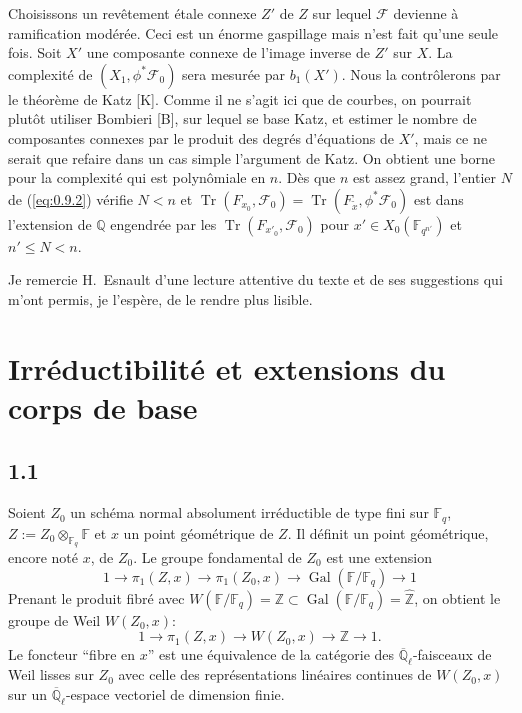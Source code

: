 \documentclass[10pt,a4paper]{article}
\theoremstyle{plain}
\theoremstyle{definition}
\DeclareMathOperator{\Gal}{Gal}
\DeclareMathOperator{\tr}{Tr}
\begin{document}
Choisissons un rev\^etement \'etale connexe $Z'$ de $Z$ sur lequel $\mathcal{F}$ devienne \`a ramification mod\'er\'ee. Ceci est un \'enorme gaspillage mais n'est fait qu'une seule fois. Soit $X'$ une composante connexe de l'image inverse de $Z'$ sur $X$. La complexit\'e de $(X_1, \phi^* \mathcal{F}_0)$ sera mesur\'ee par $b_1(X')$. Nous la contr\^olerons par le th\'eor\`eme de Katz [K]. Comme il ne s'agit ici que de courbes, on pourrait plut\^ot utiliser Bombieri [B], sur lequel se base Katz, et estimer le nombre de composantes connexes par le produit des degr\'es d'\'equations de $X'$, mais ce ne serait que refaire dans un cas simple l'argument de Katz. On obtient une borne pour la complexit\'e qui est polyn\^omiale en $n$. D\`es que $n$ est assez grand, l'entier $N$ de (\ref{eq:0.9.2}) v\'erifie $N < n$ et $\tr(F_{x_0}, \mathcal{F}_0) = \tr(F_{\tilde{x}}, \phi^* \mathcal{F}_0)$ est dans l'extension de $\mathbb{Q}$ engendr\'ee par les $\tr(F_{x'_0}, \mathcal{F}_0)$ pour $x' \in X_0(\mathbb{F}_{q^{n'}})$ et $n' \leq N < n$.

Je remercie H.~Esnault d'une lecture attentive du texte et de ses suggestions qui m'ont permis, je l'esp\`ere, de le rendre plus lisible.

\section{Irr\'eductibilit\'e et extensions du corps de base}

\subsection*{1.1}

Soient $Z_0$ un sch\'ema normal absolument irr\'eductible de type fini sur $\mathbb{F}_q$, $Z := Z_0 \otimes_{\mathbb{F}_q} \mathbb{F}$ et $x$ un point g\'eom\'etrique de $Z$. Il d\'efinit un point g\'eom\'etrique, encore not\'e $x$, de $Z_0$. Le groupe fondamental de $Z_0$ est une extension
\[
1 \to \pi_1(Z,x) \to \pi_1(Z_0,x) \to \Gal(\mathbb{F}/\mathbb{F}_q) \to 1
\]
Prenant le produit fibr\'e avec $W(\mathbb{F}/\mathbb{F}_q) = \mathbb{Z} \subset \Gal(\mathbb{F}/\mathbb{F}_q) = \hat{\mathbb{Z}}$, on obtient le groupe de Weil $W(Z_0,x)$:
\[
1 \to \pi_1(Z,x) \to W(Z_0,x) \to \mathbb{Z} \to 1.
\]
Le foncteur ``fibre en $x$'' est une \'equivalence de la cat\'egorie des $\overline{\mathbb{Q}}_\ell$-faisceaux de Weil lisses sur $Z_0$ avec celle des repr\'esentations lin\'eaires continues de $W(Z_0,x)$ sur un $\overline{\mathbb{Q}}_\ell$-espace vectoriel de dimension finie.
\end{document}
